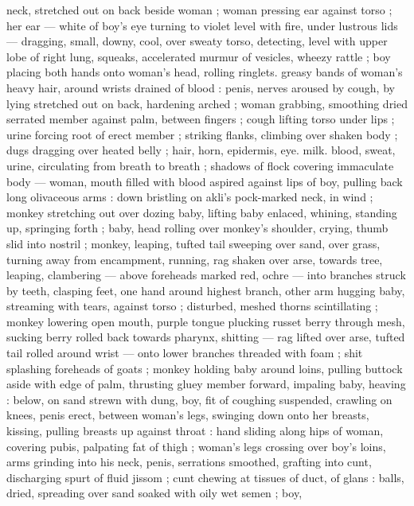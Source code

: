 neck, stretched out on back beside woman ; woman pressing ear 
against torso ; her ear --- white of boy's eye turning to violet level 
with fire, under lustrous lids --- dragging, small, downy, cool, over 
sweaty torso, detecting, level with upper lobe of right lung, squeaks, 
accelerated murmur of vesicles, wheezy rattle ; boy placing both 
hands onto woman's head, rolling ringlets. greasy bands of woman's 
heavy hair, around wrists drained of blood : penis, nerves aroused by 
cough, by lying stretched out on back, hardening arched ; woman 
grabbing, smoothing dried serrated member against palm, between 
fingers ; cough lifting torso under lips ; urine forcing root of erect 
member ;  striking flanks, climbing over shaken body ; dugs 
dragging over heated belly ; hair, horn, epidermis, eye. milk. blood, 
sweat, urine, circulating from breath to breath ; shadows of flock 
covering immaculate body --- woman, mouth filled with blood aspired 
against lips of boy, pulling back long olivaceous arms : down bristling 
on akli's pock-marked neck, in wind ; monkey stretching out over 
dozing baby, lifting baby enlaced, whining, standing up, springing 
forth ; baby, head rolling over monkey's shoulder, crying, thumb slid 
into nostril ; monkey, leaping, tufted tail sweeping over sand, over 
grass, turning away from encampment, running, rag shaken over 
arse, towards tree, leaping, clambering --- above foreheads marked 
red, ochre --- into branches struck by teeth, clasping feet, one hand 
around highest branch, other arm hugging baby, streaming with 
tears, against torso ; disturbed, meshed thorns scintillating ; monkey 
lowering open mouth, purple tongue plucking russet berry through 
mesh, sucking berry rolled back towards pharynx, shitting --- rag 
lifted over arse, tufted tail rolled around wrist --- onto lower 
branches threaded with foam ; shit splashing foreheads of goats ; 
monkey holding baby around loins, pulling buttock aside with edge 
of palm, thrusting gluey member forward, impaling baby, heaving : 
below, on sand strewn with dung, boy, fit of coughing suspended, 
crawling on knees, penis erect, between woman's legs, swinging 
down onto her breasts, kissing, pulling breasts up against throat : 
hand sliding along hips of woman, covering pubis, palpating fat of 
thigh ; woman's legs crossing over boy's loins, arms grinding into his 
neck, penis, serrations smoothed, grafting into cunt, discharging 
spurt of fluid jissom ; cunt chewing at tissues of duct, of glans : 
balls, dried, spreading over sand soaked with oily wet semen ; boy, 
